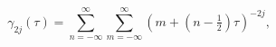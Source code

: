 \[\gamma_{2j}(\tau)=\sum_{n=-\infty}^{\infty}\sum_{m=-\infty}^{\infty}(m+(n-%
\tfrac{1}{2})\tau)^{-2j},\]